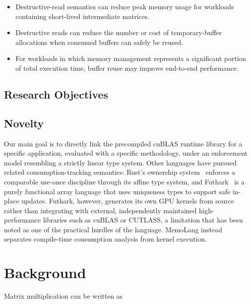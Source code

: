 \documentclass[a4paper]{article}
\begin{document}
	\begin{itemize}
	\item Destructive-read semantics can reduce peak memory usage for workloads containing short-lived intermediate matrices.
	\item Destructive reads can reduce the number or cost of temporary-buffer allocations when consumed buffers can safely be reused.
	\item For workloads in which memory management represents a significant portion of total execution time, buffer reuse may improve end-to-end performance.
	\end{itemize}
	
	\subsection{Research Objectives}
	
	
	\subsection{Novelty}
	
	Our main goal is to directly link the precompiled cuBLAS runtime library for a specific application, evaluated with a specific methodology, under an enforcement model resembling a strictly linear type system. Other languages have pursued related consumption-tracking semantics: Rust's ownership system~\cite{rust} enforces a comparable use-once discipline through its affine type system, and Futhark~\cite{futhark} is a purely functional array language that uses uniqueness types to support safe in-place updates. Futhark, however, generates its own GPU kernels from source rather than integrating with external, independently maintained high-performance libraries such as cuBLAS or CUTLASS, a limitation that has been noted as one of the practical hurdles of the language. MemoLang instead separates compile-time consumption analysis from kernel execution.
	
	\section{Background}
	
	
	Matrix multiplication can be written as
	
\end{document}
